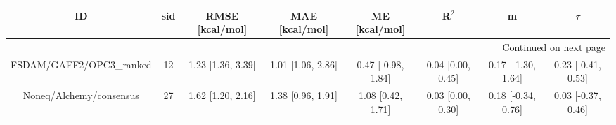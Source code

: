 \documentclass[8pt]{article}
\begin{document}
\begin{center}
\begin{footnotesize}
\begin{longtable}{|cccccccc|}
\toprule
                       ID & sid &    RMSE [kcal/mol] &     MAE [kcal/mol] &       ME [kcal/mol] &              R$^2$ &                   m &              $\tau$ \\
\midrule
\endhead
\midrule
\multicolumn{8}{r}{{Continued on next page}} \\
\midrule
\endfoot

\bottomrule
\endlastfoot
 FSDAM/GAFF2/OPC3\_ranked &  12 &  1.23 [1.36, 3.39] &  1.01 [1.06, 2.86] &  0.47 [-0.98, 1.84] &  0.04 [0.00, 0.45] &  0.17 [-1.30, 1.64] &  0.23 [-0.41, 0.53] \\
  Noneq/Alchemy/consensus &  27 &  1.62 [1.20, 2.16] &  1.38 [0.96, 1.91] &   1.08 [0.42, 1.71] &  0.03 [0.00, 0.30] &  0.18 [-0.34, 0.76] &  0.03 [-0.37, 0.46] \\
\end{longtable}
\end{footnotesize}
\end{center}
\end{document}
